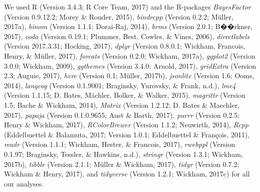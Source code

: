 \documentclass[oneside]{report}
\begin{document}
We used R (Version 3.4.3; R Core Team, 2017) and the R-packages
\emph{BayesFactor} (Version 0.9.12.2; Morey \& Rouder, 2015),
\emph{bindrcpp} (Version 0.2.2; Müller, 2017a), \emph{binom} (Version
1.1.1; Dorai-Raj, 2014), \emph{brms} (Version 2.0.1; B��rkner, 2017),
\emph{coda} (Version 0.19.1; Plummer, Best, Cowles, \& Vines, 2006),
\emph{directlabels} (Version 2017.3.31; Hocking, 2017), \emph{dplyr}
(Version 0.8.0.1; Wickham, Francois, Henry, \& Müller, 2017),
\emph{forcats} (Version 0.2.0; Wickham, 2017a), \emph{ggplot2} (Version
3.0.0; Wickham, 2009), \emph{ggthemes} (Version 3.4.0; Arnold, 2017),
\emph{gridExtra} (Version 2.3; Auguie, 2017), \emph{here} (Version 0.1;
Müller, 2017b), \emph{jsonlite} (Version 1.6; Ooms, 2014),
\emph{langcog} (Version 0.1.9001; Braginsky, Yurovsky, \& Frank, n.d.),
\emph{lme4} (Version 1.1.15; D. Bates, Mächler, Bolker, \& Walker,
2015), \emph{magrittr} (Version 1.5; Bache \& Wickham, 2014),
\emph{Matrix} (Version 1.2.12; D. Bates \& Maechler, 2017),
\emph{papaja} (Version 0.1.0.9655; Aust \& Barth, 2017), \emph{purrr}
(Version 0.2.5; Henry \& Wickham, 2017), \emph{RColorBrewer} (Version
1.1.2; Neuwirth, 2014), \emph{Rcpp} (Eddelbuettel \& Balamuta, 2017;
Version 1.0.1; Eddelbuettel \& François, 2011), \emph{readr} (Version
1.1.1; Wickham, Hester, \& Francois, 2017), \emph{rwebppl} (Version
0.1.97; Braginsky, Tessler, \& Hawkins, n.d.), \emph{stringr} (Version
1.3.1; Wickham, 2017b), \emph{tibble} (Version 2.1.1; Müller \& Wickham,
2017), \emph{tidyr} (Version 0.7.2; Wickham \& Henry, 2017), and
\emph{tidyverse} (Version 1.2.1; Wickham, 2017c) for all our analyses.
\end{document}
